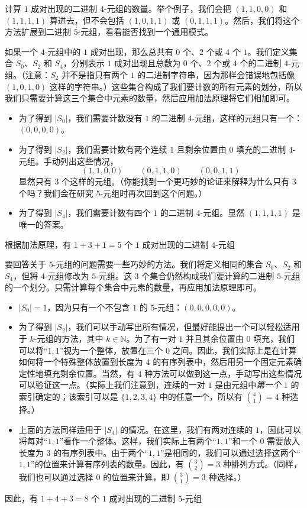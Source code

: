 \begin{example}
    计算 $1$ 成对出现的二进制 $4$-元组的数量。举个例子，我们会把 $(1, 1, 0, 0)$ 和 $(1, 1, 1, 1)$ 算进去，但不会包括 $(1, 0, 1, 1)$ 或 $(0, 1, 1, 1)$。然后，我们将这个方法扩展到二进制 $5$-元组，看看能否找到一个通用模式。

    如果一个 $4$-元组中的 $1$ 成对出现，那么总共有 $0$ 个、$2$ 个或 $4$ 个 $1$。我们定义集合 $S_0$、$S_2$ 和 $S_4$，分别表示 $1$ 成对出现且总数为 $0$ 个、$2$ 个或 $4$ 个的二进制 $4$-元组。（注意：$S_2$ 并不是指只有两个 $1$ 的二进制字符串，因为那样会错误地包括像 $(1, 0, 1, 0)$ 这样的字符串。）这些集合构成了我们要计数的所有元素的划分，所以我们只需要计算这三个集合中元素的数量，然后应用加法原理将它们相加即可。
    \begin{itemize}
        \item 为了得到 $|S_0|$，我们需要计数没有 $1$ 的二进制 $4$-元组，这样的元组只有一个：$(0, 0, 0, 0)$。
        \item 为了得到 $|S_2|$，我们需要计数有两个连续 $1$ 且剩余位置由 $0$ 填充的二进制 $4$-元组。手动列出这些情况，
              \[(1, 1, 0, 0) \qquad (0, 1, 1, 0) \qquad (0, 0, 1, 1)\]
              显然只有 $3$ 个这样的元组。（你能找到一个更巧妙的论证来解释为什么只有 $3$ 个吗？我们会在研究 $5$-元组时再次回到这个问题。）
        \item 为了得到 $|S_4|$，我们需要计数有四个 $1$ 的二进制 $4$-元组。显然 $(1, 1, 1, 1)$ 是唯一的答案。
    \end{itemize}
    根据加法原理，有 $ 1 + 3 + 1 = 5$ 个 $1$ 成对出现的二进制 $4$-元组

    要回答关于 $5$-元组的问题需要一些巧妙的方法。我们将定义相同的集合 $S_0$、$S_2$ 和 $S_4$，但将 $4$-元组修改为 $5$-元组。这 $3$ 个集合仍然构成我们要计算的二进制 $5$-元组的一个划分。只需计算每个集合中元素的数量，再应用加法原理即可。
    \begin{itemize}
        \item $|S_0|=1$，因为只有一个不包含 $1$ 的 $5$-元组：$(0, 0, 0, 0, 0)$。
        \item 为了得到 $|S_2|$，我们可以手动写出所有情况，但最好能提出一个可以轻松适用于 $k$-元组的方法，其中 $k \in \mathbb{N}$。为了有一对 $1$ 并且其余位置由 $0$ 填充，我们可以将``$1, 1$''视为一个整体，放置在三个 $0$ 之间。因此，我们实际上是在计算如何将一个特殊整体放置到长度为 $4$ 的有序列表中，然后用另一个固定元素确定性地填充剩余位置。当然，有 $4$ 种方法可以做到这一点，手动写出这些情况可以验证这一点。（实际上我们注意到，连续的一对 $1$ 是由元组中\emph{第一个} $1$ 的索引确定的；该索引可以是 $\{1, 2, 3, 4\}$ 中的任意一个，所以有 ${4 \choose 1} = 4$ 种选择。）
        \item 上面的方法同样适用于 $|S_4|$ 的情况。在这里，我们有两对连续的 $1$，因此可以将每对``$1,1$''看作一个整体。这样，我们实际上有两个``$1,1$''和一个 $0$ 需要放入长度为 $3$ 的有序列表中。由于两个``$1,1$''是相同的，我们可以通过选择这两个``$1,1$''的位置来计算有序列表的数量。因此，有 ${3 \choose 2} = 3$ 种排列方式。（同样，我们也可以通过选择 $0$ 的位置来计算，即 ${3 \choose 1} = 3$ 种选择。）
    \end{itemize}
    因此，有 $1 + 4 + 3 = 8$ 个 $1$ 成对出现的二进制 $5$-元组
\end{example}

